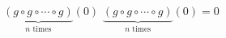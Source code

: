 {$\underbrace{(g \circ g \circ \cdots \circ g)}_{\mbox{$n$ times}}(0)$}
{$\underbrace{(g \circ g \circ \cdots \circ g)}_{\mbox{$n$ times}}(0) = 0$}